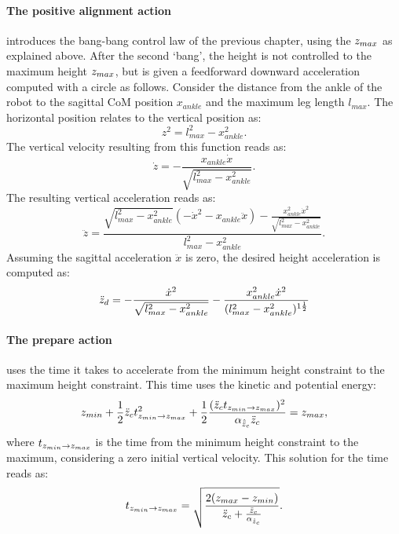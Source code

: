 \paragraph{The positive alignment action} introduces the bang-bang control law of the previous chapter, using the $z_{max}$ as explained above. After the second `bang', the height is not controlled to the maximum height $z_{max}$, but is given a feedforward downward acceleration computed with a circle as follows. Consider the distance from the ankle of the robot to the sagittal \ac{CoM} position $x_{ankle}$ and the maximum leg length $l_{max}$. The horizontal position relates to the vertical position as:
\begin{equation}
z^2 = l_{max}^2-x_{ankle}^2.
\end{equation}
The vertical velocity resulting from this function reads as:
\begin{equation}
 \dot{z} = -\frac{x_{ankle}\dot{x}}{\sqrt{l_{max}^2-x_{ankle}^2}}.
\end{equation}
The resulting vertical acceleration reads as:
\begin{equation}
\ddot{z} = \frac{\sqrt{l_{max}^2-x_{ankle}^2}(-\dot{x}^2-x_{ankle}\ddot{x}) - \frac{x_{ankle}^2\dot{x}^2}{\sqrt{l_{max}^2-x_{ankle}^2}}}{ l_{max}^2-x_{ankle}^2}.
\end{equation}
Assuming the sagittal acceleration $\ddot{x}$ is zero, the desired height acceleration is computed as:
\begin{equation}
 \ddot{z}_d = -\frac{\dot{x}^2}{\sqrt{ l_{max}^2-x_{ankle}^2}} - \frac{x_{ankle}^2\dot{x}^2}{(l_{max}^2-x_{ankle}^2)^{1\frac{1}{2}}}
\end{equation}
\paragraph{The prepare action} uses the time it takes to accelerate from the minimum height constraint to the maximum height constraint. This time uses the kinetic and potential energy:
\begin{equation}
	z_{min} + \frac{1}{2}\ddot{z}_{c} t_{z_{min} \rightarrow z_{max}}^2 + \frac{1}{2}\frac{(\ddot{z}_{c} t_{z_{min} \rightarrow z_{max}})^2}{\alpha_{\hat{\ddot{z}}_{c}} \ddot{z}_{c}} = z_{max},
\end{equation}
where $t_{z_{min} \rightarrow z_{max}}$ is the time from the minimum height constraint to the maximum, considering a zero initial vertical velocity.
This solution for the time reads as:
\begin{equation}
 t_{z_{min} \rightarrow z_{max}}= \sqrt{\frac{2(z_{max} - z_{min})}{\ddot{z}_{c} + \frac{\ddot{z}_{c}}{\alpha_{\hat{\ddot{z}}_{c}}} }}.
\end{equation}

